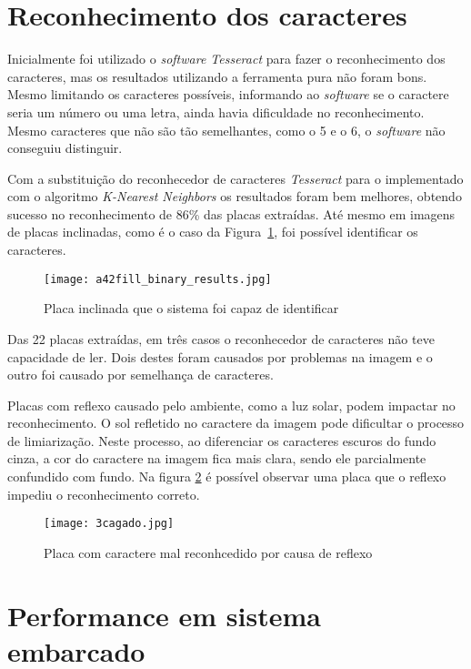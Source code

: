 \section{Reconhecimento dos caracteres}
\label{sec:reconhecimento_dos_caracteres_resultados}

Inicialmente foi utilizado o \emph{software Tesseract} para fazer o reconhecimento dos caracteres, mas os resultados utilizando a ferramenta pura não foram bons. Mesmo limitando os caracteres possíveis, informando ao \emph{software} se o caractere seria um número ou uma letra, ainda havia dificuldade no reconhecimento. Mesmo caracteres que não são tão semelhantes, como o 5 e o 6, o \emph{software} não conseguiu distinguir.

Com a substituição do reconhecedor de caracteres \emph{Tesseract} para o implementado com o algoritmo \emph{K-Nearest Neighbors} os resultados foram bem melhores, obtendo sucesso no reconhecimento de 86\% das placas extraídas. Até mesmo em imagens de placas inclinadas, como é o caso da Figura~\ref{fig:plate_torta_result}, foi possível identificar os caracteres.

\begin{figure}[H]
	\centering
	\texttt{[image: a42fill\_binary\_results.jpg]}
	\caption{Placa inclinada que o sistema foi capaz de identificar}
	\label{fig:plate_torta_result}
\end{figure}

Das 22 placas extraídas, em três casos o reconhecedor de caracteres não teve capacidade de ler. Dois destes foram causados por problemas na imagem e o outro foi causado por semelhança de caracteres. 

Placas com reflexo causado pelo ambiente, como a luz solar, podem impactar no reconhecimento. O sol refletido no caractere da imagem pode dificultar o processo de limiarização. Neste processo, ao diferenciar os caracteres escuros do fundo cinza, a cor do caractere na imagem fica mais clara, sendo ele parcialmente confundido com fundo. Na figura \ref{fig:cagado_reflexo} é possível observar uma placa que o reflexo impediu o reconhecimento correto.

\begin{figure}[H]
	\centering
	\texttt{[image: 3cagado.jpg]}
	\caption{Placa com caractere mal reconhcedido por causa de reflexo}
	\label{fig:cagado_reflexo}
\end{figure}

\section{Performance em sistema embarcado}
\label{sec:performance_resultados}

